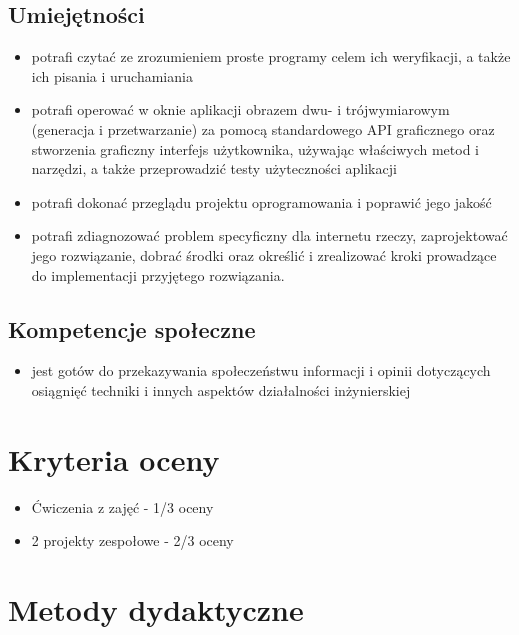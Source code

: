 \documentclass[12pt, a4paper]{article}
\begin{document}
\subsection*{Umiejętności}
\begin{itemize}
  \item potrafi czytać ze zrozumieniem proste programy celem ich weryfikacji, a także ich pisania i uruchamiania
  \item potrafi operować w oknie aplikacji obrazem dwu- i trójwymiarowym (generacja i przetwarzanie) za pomocą standardowego API graficznego oraz stworzenia graficzny interfejs użytkownika, używając właściwych metod i narzędzi, a także przeprowadzić testy użyteczności aplikacji
  \item potrafi dokonać przeglądu projektu oprogramowania i poprawić jego jakość
  \item potrafi zdiagnozować problem specyficzny dla internetu rzeczy, zaprojektować jego rozwiązanie, dobrać środki oraz określić i zrealizować kroki prowadzące do implementacji przyjętego rozwiązania.
\end{itemize}

\subsection*{Kompetencje społeczne}
\begin{itemize}
  \item jest gotów do przekazywania społeczeństwu informacji i opinii dotyczących osiągnięć techniki i innych aspektów działalności inżynierskiej
\end{itemize}

\section{Kryteria oceny}

\begin{itemize}
  \item Ćwiczenia z zajęć - 1/3 oceny
  \item 2 projekty zespołowe - 2/3 oceny
\end{itemize}

\section{Metody dydaktyczne}
\end{document}
